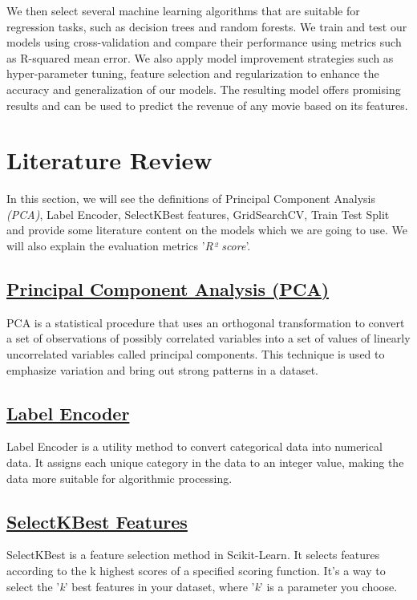 \documentclass[conference]{IEEEtran}
\begin{document}
        We then select several machine learning algorithms that are suitable for regression tasks, such as decision trees and random forests. We train and test our models using cross-validation and compare their performance using metrics such as R-squared mean error. We also apply model improvement strategies such as hyper-parameter tuning, feature selection and regularization to enhance the accuracy and generalization of our models. The resulting model offers promising results and can be used to predict the revenue of any movie based on its features.

\section{Literature Review}
    In this section, we will see the definitions of Principal Component Analysis \textit{(PCA)}, Label Encoder, SelectKBest features, GridSearchCV, Train Test Split and provide some literature content on the models which we are going to use. We will also explain the evaluation metrics '\textit{R² score}'.

    \subsection*{\href{https://en.wikipedia.org/wiki/Principal_component_analysis}{Principal Component Analysis (PCA)}}
    PCA is a statistical procedure that uses an orthogonal transformation to convert a set of observations of possibly correlated variables into a set of values of linearly uncorrelated variables called principal components. This technique is used to emphasize variation and bring out strong patterns in a dataset.

    \subsection*{\href{https://scikit-learn.org/stable/modules/generated/sklearn.preprocessing.LabelEncoder.html}{Label Encoder}}
    Label Encoder is a utility method to convert categorical data into numerical data. It assigns each unique category in the data to an integer value, making the data more suitable for algorithmic processing.

    \subsection*{\href{https://scikit-learn.org/stable/modules/generated/sklearn.feature_selection.SelectKBest.html}{SelectKBest Features}}
    SelectKBest is a feature selection method in Scikit-Learn. It selects features according to the k highest scores of a specified scoring function. It's a way to select the '\textit{k}' best features in your dataset, where '\textit{k}' is a parameter you choose.
\end{document}
